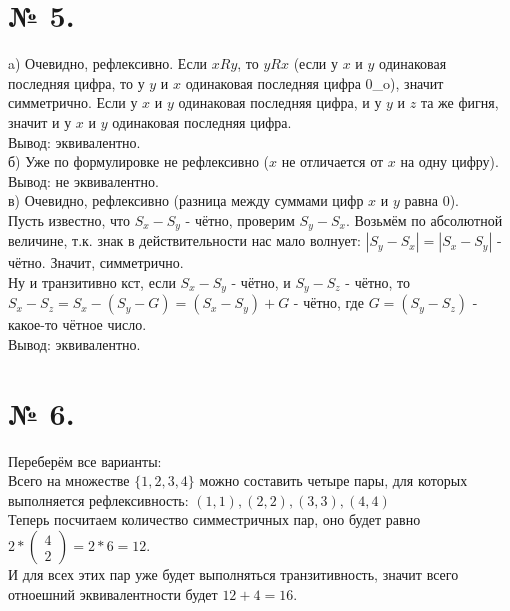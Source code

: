 \documentclass[a4paper,11pt]{report}
\begin{document}
\section{№ 5.}
a) Очевидно, рефлексивно. Если $xRy$, то $yRx$ (если у $x$ и $y$ одинаковая последняя цифра, то у $y$ и $x$ одинаковая последняя цифра 0\_o),
значит симметрично. Если у $x$ и $y$ одинаковая последняя цифра, и у $y$ и $z$ та же фигня, значит и у $x$ и $y$ одинаковая последняя цифра.\\
Вывод: эквивалентно.\\
б) Уже по формулировке не рефлексивно ($x$ не отличается от $x$ на одну цифру).\\
Вывод: не эквивалентно.\\
в) Очевидно, рефлексивно (разница между суммами цифр $x$ и $y$ равна $0$).\\
Пусть известно, что $S_x - S_y$ - чётно, проверим $S_y - S_x$. Возьмём по абсолютной величине, т.к. знак в действительности нас
мало волнует: $|S_y - S_x| = |S_x - S_y|$ - чётно. Значит, симметрично.\\
Ну и транзитивно кст, если $S_x - S_y$ - чётно, и $S_y - S_z$ -  чётно, то $S_x - S_z = S_x - (S_y - G) = (S_x - S_y) + G$ - чётно,
где $G = (S_y - S_z)$ - какое-то чётное число.\\
Вывод: эквивалентно.
\section{№ 6.}
Переберём все варианты:\\
Всего на множестве $\{1, 2, 3, 4\}$ можно составить четыре пары, для которых выполняется рефлексивность: 
$(1, 1), (2, 2), (3, 3), (4, 4)$\\
Теперь посчитаем количество симместричных пар, оно будет равно $2 * 
\begin{pmatrix}
4\\
2
\end{pmatrix}
= 2 *6 = 12$.\\
И для всех этих пар уже будет выполняться транзитивность, значит всего отноешний эквивалентности будет
$12 + 4 = 16$.
\end{document}
